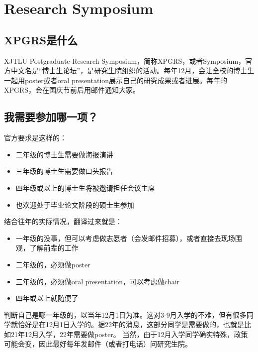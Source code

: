 \section{Research Symposium}

\subsection{XPGRS是什么}
XJTLU Postgraduate Research Symposium，简称XPGRS，或者Symposium，官方中文名是“博士生论坛”，是研究生院组织的活动。每年12月，会让全校的博士生一起用poster或者oral presentation展示自己的研究成果或者进展。每年的XPGRS，会在国庆节前后用邮件通知大家。

\subsection{我需要参加哪一项？}

官方要求是这样的：

\begin{itemize}
    \item 二年级的博士生需要做海报演讲
    \item 三年级的博士生需要做口头报告
    \item 四年级或以上的博士生将被邀请担任会议主席
    \item 也欢迎处于毕业论文阶段的硕士生参加
\end{itemize}

结合往年的实际情况，翻译过来就是：

\begin{itemize}
    \item 一年级的没事，但可以考虑做志愿者（会发邮件招募），或者直接去现场围观，了解前辈的工作
    \item 二年级的，必须做poster
    \item 三年级的，必须做oral presentation，可以考虑做chair
    \item 四年或以上就随便了
\end{itemize}

判断自己是哪一年级的，以当年12月1日为准。这对3-9月入学的不难，但有很多同学就恰好是在12月1日入学的。据22年的消息，这部分同学是需要做的，也就是比如21年12月入学，22年需要做poster。
%
当然，由于12月入学同学确实特殊，政策可能会变，因此最好每年发邮件（或者打电话）问研究生院。


